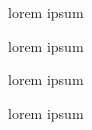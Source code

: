 


lorem ipsum
{\small 
\begin{myenumerate}
\item{} lorem ipsum
\item{} lorem ipsum
\end{myenumerate}
}
lorem ipsum




